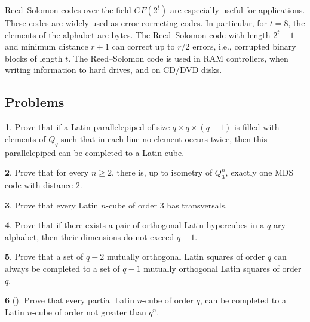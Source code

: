 \documentclass[11pt]{article}
\theoremstyle{definition}
\newtheorem{exercise}{\quad}
\begin{document}
{{{Reed--Solomon codes over the
field $GF(2^t)$ are especially useful for applications. These codes are widely used as error-correcting codes.  In particular, for $t=8$, the elements of the alphabet are
bytes.  The Reed--Solomon code  with length $2^t-1$ and minimum distance $r+1$ can correct up to
$r/2$ errors,  i.e., corrupted  binary blocks of length $t$.
 The Reed--Solomon code is used in RAM controllers, when writing information to
hard drives, and on CD/DVD disks.





\subsection{Problems}



\begin{exercise}
Prove that if a Latin parallelepiped of size $q\times
q\times (q-1)$ is filled with elements of $Q_q$ such that in each line
no element occurs twice, then this parallelepiped can be
completed to a Latin cube.\end{exercise}

\begin{exercise}
Prove that for every $n\geq 2$, there is,
up to isometry of  $Q^n_3$,  exactly one {\rm MDS} code with distance $2$.
\end{exercise}


\begin{exercise}
Prove that  every  Latin $n$-cube of order $3$ has transversals.
\end{exercise}

\begin{exercise}
 Prove that if there exists a pair of
orthogonal Latin hypercubes in a $q$-ary alphabet, then their
dimensions do not exceed $q-1$.
\end{exercise}

\begin{exercise}
Prove that a set of $q-2$ mutually orthogonal Latin
squares of order $q$ can always be completed
 to a set of $q-1$ mutually orthogonal Latin squares of order $q$.
\end{exercise}

\begin{exercise}[\cite{Pot22}]
Prove that every partial Latin $n$-cube of order $q$, 
 can be completed to a Latin $n$-cube of order not greater than $q^n$.
\end{exercise}


}}}
\end{document}
